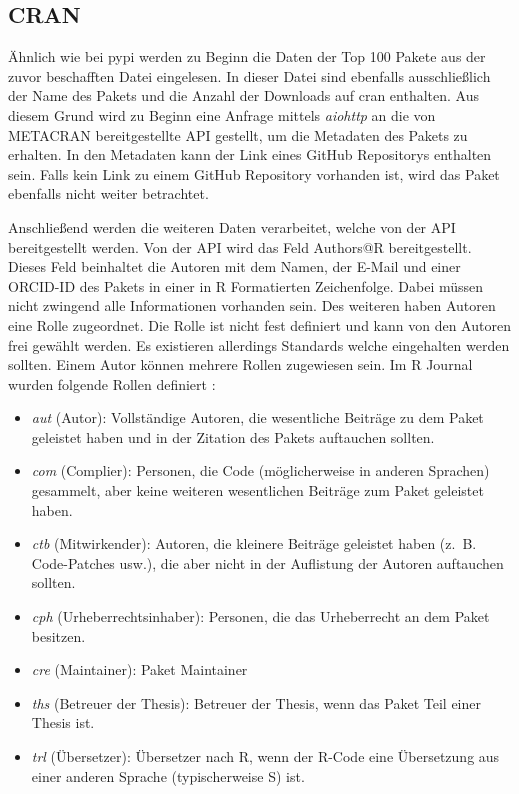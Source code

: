 \subsection{CRAN}
\label{subsec:datenbeschaffung_cran}
Ähnlich wie bei \gls{pypi} werden zu Beginn die Daten der Top 100 Pakete aus der zuvor beschafften Datei eingelesen.
In dieser Datei sind ebenfalls ausschließlich der Name des Pakets und die Anzahl der Downloads auf \gls{cran} enthalten.
Aus diesem Grund wird zu Beginn eine Anfrage mittels \emph{aiohttp} an die von METACRAN bereitgestellte API gestellt, um die Metadaten des Pakets zu erhalten.
In den Metadaten kann der Link eines GitHub Repositorys enthalten sein.
Falls kein Link zu einem GitHub Repository vorhanden ist, wird das Paket ebenfalls nicht weiter betrachtet.

Anschließend werden die weiteren Daten verarbeitet, welche von der API bereitgestellt werden.
Von der API wird das Feld \glqq Authors@R\grqq{} bereitgestellt.
Dieses Feld beinhaltet die Autoren mit dem Namen, der E-Mail und einer ORCID-ID des Pakets in einer in R Formatierten Zeichenfolge.
Dabei müssen nicht zwingend alle Informationen vorhanden sein.
Des weiteren haben Autoren eine Rolle zugeordnet.
Die Rolle ist nicht fest definiert und kann von den Autoren frei gewählt werden.
Es existieren allerdings Standards welche eingehalten werden sollten.
Einem Autor können mehrere Rollen zugewiesen sein.
Im R Journal wurden folgende Rollen definiert \autocite{hornik_who_2011}:

\begin{itemize}
    \item \glqq \emph{aut}\grqq{} (Autor): Vollständige Autoren, die wesentliche Beiträge zu dem Paket geleistet haben und in der Zitation des Pakets auftauchen sollten.
    \item \glqq \emph{com}\grqq{} (Complier): Personen, die Code (möglicherweise in anderen Sprachen) gesammelt, aber keine weiteren wesentlichen Beiträge zum Paket geleistet haben.
    \item \glqq \emph{ctb}\grqq{} (Mitwirkender): Autoren, die kleinere Beiträge geleistet haben (z. B. Code-Patches usw.), die aber nicht in der Auflistung der Autoren auftauchen sollten.
    \item \glqq \emph{cph}\grqq{} (Urheberrechtsinhaber): Personen, die das Urheberrecht an dem Paket besitzen.
    \item \glqq \emph{cre}\grqq{} (Maintainer): Paket Maintainer
    \item \glqq \emph{ths}\grqq{} (Betreuer der Thesis): Betreuer der Thesis, wenn das Paket Teil einer Thesis ist.
    \item \glqq \emph{trl}\grqq{} (Übersetzer): Übersetzer nach R, wenn der R-Code eine Übersetzung aus einer anderen Sprache (typischerweise S) ist.
\end{itemize}

